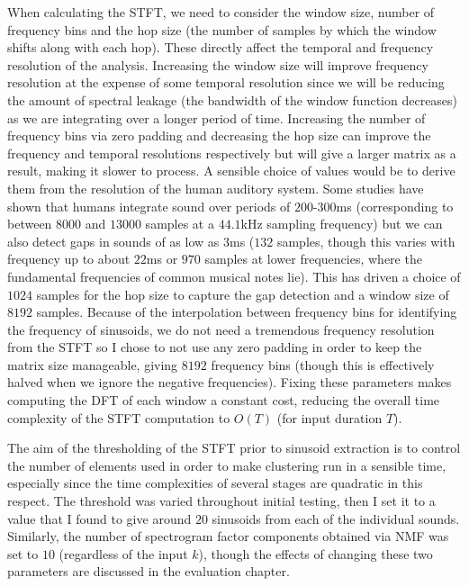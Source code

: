 \documentclass[12pt,a4paper,twoside,openright]{report}
\begin{document}
When calculating the STFT, we need to consider the window size, number of frequency bins and the hop size (the number of samples by which the window shifts along with each hop). These directly affect the temporal and frequency resolution of the analysis. Increasing the window size will improve frequency resolution at the expense of some temporal resolution since we will be reducing the amount of spectral leakage (the bandwidth of the window function decreases) as we are integrating over a longer period of time. Increasing the number of frequency bins via zero padding and decreasing the hop size can improve the frequency and temporal resolutions respectively but will give a larger matrix as a result, making it slower to process. A sensible choice of values would be to derive them from the resolution of the human auditory system. Some studies have shown that humans integrate sound over periods of $ 200 $-$ 300 $ms \cite{gelfand1998hearing} (corresponding to between $ 8000 $ and $ 13000 $ samples at a $ 44.1 $kHz sampling frequency) but we can also detect gaps in sounds of as low as $ 3 $ms \cite{shailer1983gap} ($ 132 $ samples, though this varies with frequency up to about $ 22 $ms or $ 970 $ samples at lower frequencies, where the fundamental frequencies of common musical notes lie). This has driven a choice of $ 1024 $ samples for the hop size to capture the gap detection and a window size of $ 8192 $ samples. Because of the interpolation between frequency bins for identifying the frequency of sinusoids, we do not need a tremendous frequency resolution from the STFT so I chose to not use any zero padding in order to keep the matrix size manageable, giving $ 8192 $ frequency bins (though this is effectively halved when we ignore the negative frequencies). Fixing these parameters makes computing the DFT of each window a constant cost, reducing the overall time complexity of the STFT computation to $ O(T) $ (for input duration $ T $).

{\color{red}The aim of the thresholding of the STFT prior to sinusoid extraction is to control the number of elements used in order to make clustering run in a sensible time, especially since the time complexities of several stages are quadratic in this respect. The threshold was varied throughout initial testing, then I set it to a value that I found to give around $ 20 $ sinusoids from each of the individual sounds.} Similarly, the number of spectrogram factor components obtained via NMF was set to $ 10 $ (regardless of the input $ k $), though the effects of changing these two parameters are discussed in the evaluation chapter.
\end{document}
